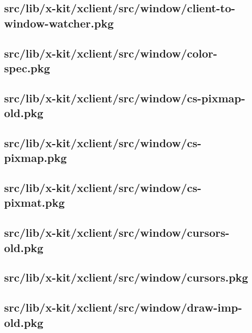 \subsection{src/lib/x-kit/xclient/src/window/client-to-window-watcher.pkg}


\subsection{src/lib/x-kit/xclient/src/window/color-spec.pkg}


\subsection{src/lib/x-kit/xclient/src/window/cs-pixmap-old.pkg}


\subsection{src/lib/x-kit/xclient/src/window/cs-pixmap.pkg}


\subsection{src/lib/x-kit/xclient/src/window/cs-pixmat.pkg}


\subsection{src/lib/x-kit/xclient/src/window/cursors-old.pkg}


\subsection{src/lib/x-kit/xclient/src/window/cursors.pkg}


\subsection{src/lib/x-kit/xclient/src/window/draw-imp-old.pkg}



